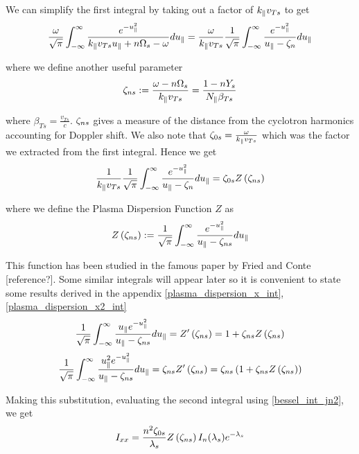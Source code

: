 We can simplify the first integral by taking out a factor of $k_\parallel v_{Ts}$ to get
\begin{equation}
	\frac{\omega}{\sqrt{\pi}} \int_{-\infty}^\infty \frac{e^{-u_\parallel^2}}{k_\parallel v_{Ts} u_\parallel + n\Omega_s - \omega} du_\parallel = \frac{\omega}{k_\parallel v_{Ts}} \frac{1}{\sqrt{\pi}} \int_{-\infty}^\infty \frac{e^{-u_\parallel^2}}{u_\parallel - \zeta_n} du_\parallel
\end{equation}

where we define another useful parameter
\begin{equation}
	\zeta_{ns} := \frac{\omega - n \Omega_s}{k_\parallel v_{Ts}} = \frac{1 - nY_s}{N_\parallel \beta_{Ts}}
\end{equation}

where $\beta_{Ts} = \frac{v_{Ts}}{c}$. $\zeta_{ns}$ gives a measure of the distance from the cyclotron harmonics accounting for Doppler shift. We also note that $\zeta_{0s} = \frac{\omega}{k_\parallel v_{Ts}}$ which was the factor we extracted from the first integral. Hence we get
\begin{equation*}
	\frac{1}{k_\parallel v_{Ts}} \frac{1}{\sqrt{\pi}} \int_{-\infty}^\infty \frac{e^{-u_\parallel^2}}{u_\parallel - \zeta_n} du_\parallel = \zeta_{0s} Z \left( \zeta_{ns} \right)
\end{equation*}

where we define the Plasma Dispersion Function $Z$ as
\begin{equation}
	Z \left( \zeta_{ns} \right) := \frac{1}{\sqrt{\pi}} \int_{-\infty}^\infty \frac{e^{-u_\parallel^2}}{u_\parallel - \zeta_{ns}} du_\parallel
\end{equation}

This function has been studied in the famous paper by Fried and Conte [reference?]. Some similar integrals will appear later so it is convenient to state some results derived in the appendix \eqref{plasma_dispersion_x_int}, \eqref{plasma_dispersion_x2_int}
\begin{equation*}
	\frac{1}{\sqrt{\pi}} \int_{-\infty}^\infty \frac{u_\parallel e^{-u_\parallel^2}}{u_\parallel - \zeta_{ns}} du_\parallel = Z' \left( \zeta_{ns} \right) = 1 + \zeta_{ns} Z \left( \zeta_{ns} \right)
\end{equation*}
\begin{equation*}
	\frac{1}{\sqrt{\pi}} \int_{-\infty}^\infty \frac{u_\parallel^2 e^{-u_\parallel^2}}{u_\parallel - \zeta_{ns}} du_\parallel = \zeta_{ns} Z' \left( \zeta_{ns} \right) = \zeta_{ns} \left( 1 + \zeta_{ns} Z \left( \zeta_{ns} \right) \right)
\end{equation*}

Making this substitution, evaluating the second integral using \eqref{bessel_int_jn2}, we get
\begin{equation*}
	I_{xx} = \frac{n^2 \zeta_{0s}}{\lambda_s} Z \left( \zeta_{ns} \right) I_n(\lambda_s) e^{-\lambda_s}
\end{equation*}

